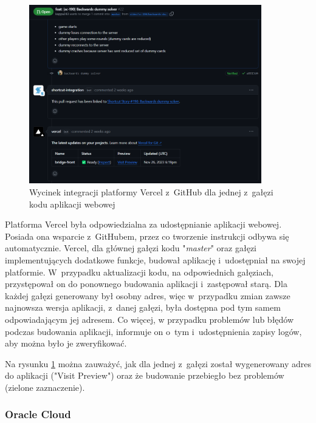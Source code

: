 \begin{figure}[!]
    \centering
    \includegraphics[width=0.9\textwidth]{img/github/github-vercel.png}
    \caption{Wycinek integracji platformy Vercel z~GitHub dla jednej z~gałęzi kodu aplikacji webowej}
    \label{fig:github-vercel}
\end{figure}

Platforma Vercel była odpowiedzialna za
udostępnianie aplikacji webowej. Posiada ona wsparcie \mbox{z~GitHubem},
przez co tworzenie instrukcji odbywa się automatycznie.
Vercel, dla głównej gałęzi kodu "\textit{master}"\xspace oraz
gałęzi implementujących dodatkowe funkcje, budował aplikację
i~udostępniał na swojej platformie. W~przypadku aktualizacji
kodu, na odpowiednich gałęziach, przystępował on do ponownego
budowania aplikacji i~zastępował starą. Dla każdej gałęzi
generowany był osobny adres, więc w~przypadku zmian zawsze
najnowsza wersja aplikacji, z~danej gałęzi, była dostępna pod
tym samem odpowiadającym jej adresem. Co więcej, w przypadku
problemów lub błędów podczas budowania aplikacji, informuje
on o~tym i~udostępnienia zapisy logów, aby można było je
zweryfikować.

Na rysunku
\ref{fig:github-vercel} można zauważyć, jak dla jednej
z~gałęzi został wygenerowany adres do aplikacji
("Visit Preview") oraz że budowanie przebiegło bez problemów
(zielone zaznaczenie).

\FloatBarrier


\subsubsection{Oracle Cloud}

